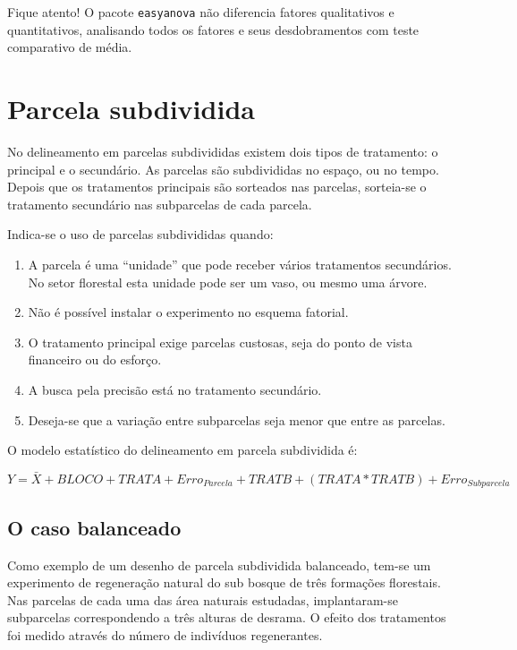 \documentclass[
]{article}
\providecommand{\tightlist}{%
  \setlength{\itemsep}{0pt}\setlength{\parskip}{0pt}}
\begin{document}
Fique atento! O pacote \texttt{easyanova} não diferencia fatores qualitativos e quantitativos, analisando todos os fatores e seus desdobramentos com teste comparativo de média.

\hypertarget{parcela-subdividida}{%
\section{Parcela subdividida}\label{parcela-subdividida}}

No delineamento em parcelas subdivididas existem dois tipos de tratamento: o principal e o secundário. As parcelas são subdivididas no espaço, ou no tempo. Depois que os tratamentos principais são sorteados nas parcelas, sorteia-se o tratamento secundário nas subparcelas de cada parcela.

Indica-se o uso de parcelas subdivididas quando:

\begin{enumerate}
\def\labelenumi{\arabic{enumi}.}
\tightlist
\item
  A parcela é uma ``unidade'' que pode receber vários tratamentos secundários. No setor florestal esta unidade pode ser um vaso, ou mesmo uma árvore.
\item
  Não é possível instalar o experimento no esquema fatorial.
\item
  O tratamento principal exige parcelas custosas, seja do ponto de vista financeiro ou do esforço.
\item
  A busca pela precisão está no tratamento secundário.
\item
  Deseja-se que a variação entre subparcelas seja menor que entre as parcelas.
\end{enumerate}

O modelo estatístico do delineamento em parcela subdividida é:

\[Y = \bar{X} + BLOCO + TRAT A + Erro_{Parcela} + TRAT B + (TRAT A * TRAT B) + Erro_{Subparcela}\]

\hypertarget{o-caso-balanceado-4}{%
\subsection{O caso balanceado}\label{o-caso-balanceado-4}}

Como exemplo de um desenho de parcela subdividida balanceado, tem-se um experimento de regeneração natural do sub bosque de três formações florestais. Nas parcelas de cada uma das área naturais estudadas, implantaram-se subparcelas correspondendo a três alturas de desrama. O efeito dos tratamentos foi medido através do número de indivíduos regenerantes.
\end{document}

